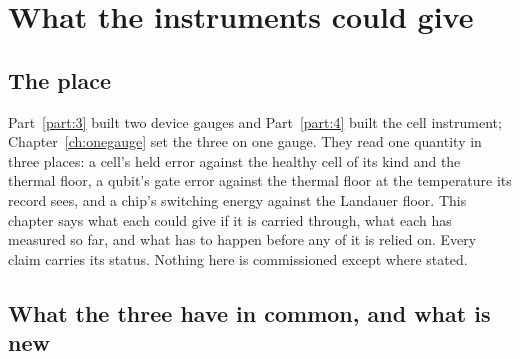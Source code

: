 \chapter{What the instruments could give}\label{ch:reach}

\section*{The place}
Part~\ref{part:3} built two device gauges and Part~\ref{part:4} built the cell instrument; Chapter~\ref{ch:onegauge} set the three on one gauge. They read
one quantity in three places: a cell's held error against the healthy cell of its kind and the thermal floor, a qubit's gate error against the
thermal floor at the temperature its record sees, and a chip's switching energy against the Landauer floor. This chapter says what each could give if it is carried through, what
each has measured so far, and what has to happen before any of it is relied on. Every claim carries its status. Nothing here is commissioned
except where stated.

\section{What the three have in common, and what is new}

